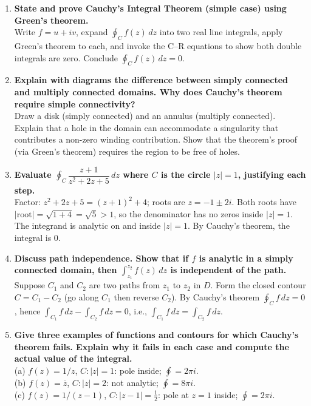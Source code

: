 \documentclass[12pt,a4paper]{article}
\begin{document}
\begin{enumerate}
  \item \textbf{State and prove Cauchy's Integral Theorem (simple case) using Green's theorem.}\\
        Write $f=u+iv$, expand $\oint_{C}f(z)\,dz$ into two real line integrals,
        apply Green's theorem to each, and invoke the C--R equations to show both double
        integrals are zero.
        Conclude $\oint_{C}f(z)\,dz = 0$.

  \item \textbf{Explain with diagrams the difference between simply connected and multiply connected
        domains. Why does Cauchy's theorem require simple connectivity?}\\
        Draw a disk (simply connected) and an annulus (multiply connected).
        Explain that a hole in the domain can accommodate a singularity that contributes
        a non-zero winding contribution.
        Show that the theorem's proof (via Green's theorem) requires the region to be free of holes.

  \item \textbf{Evaluate $\oint_{C}\dfrac{z+1}{z^2+2z+5}\,dz$ where $C$ is the circle $|z|=1$,
        justifying each step.}\\
        Factor: $z^2+2z+5 = (z+1)^2 + 4$; roots are $z = -1 \pm 2i$.
        Both roots have $|\text{root}|= \sqrt{1+4} = \sqrt{5} > 1$,
        so the denominator has no zeros inside $|z|=1$.
        The integrand is analytic on and inside $|z|=1$.
        By Cauchy's theorem, the integral is $0$.

  \item \textbf{Discuss path independence. Show that if $f$ is analytic in a simply connected
        domain, then $\int_{z_1}^{z_2}f(z)\,dz$ is independent of the path.}\\
        Suppose $C_1$ and $C_2$ are two paths from $z_1$ to $z_2$ in $D$.
        Form the closed contour $C = C_1 - C_2$ (go along $C_1$ then reverse $C_2$).
        By Cauchy's theorem $\oint_{C}f\,dz = 0$,
        hence $\int_{C_1}f\,dz - \int_{C_2}f\,dz = 0$,
        i.e., $\int_{C_1}f\,dz = \int_{C_2}f\,dz$.

  \item \textbf{Give three examples of functions and contours for which Cauchy's theorem fails.
        Explain why it fails in each case and compute the actual value of the integral.}\\
        (a) $f(z)=1/z$, $C: |z|=1$: pole inside; $\oint = 2\pi i$.\\
        (b) $f(z)=\overline{z}$, $C: |z|=2$: not analytic; $\oint = 8\pi i$.\\
        (c) $f(z)=1/(z-1)$, $C: |z-1|=\tfrac{1}{2}$: pole at $z=1$ inside; $\oint = 2\pi i$.
\end{enumerate}
\end{document}
